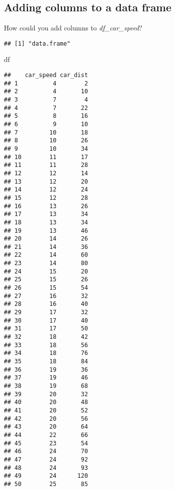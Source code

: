 \documentclass[
]{article}
\newenvironment{Shaded}{\begin{snugshade}}{\end{snugshade}}
\newcommand{\CommentTok}[1]{\textcolor[rgb]{0.56,0.35,0.01}{\textit{#1}}}
\newcommand{\KeywordTok}[1]{\textcolor[rgb]{0.13,0.29,0.53}{\textbf{#1}}}
\newcommand{\NormalTok}[1]{#1}
\newcommand{\OperatorTok}[1]{\textcolor[rgb]{0.81,0.36,0.00}{\textbf{#1}}}
\newcommand{\StringTok}[1]{\textcolor[rgb]{0.31,0.60,0.02}{#1}}
\begin{document}
\hypertarget{adding-columns-to-a-data-frame}{%
\subsection{Adding columns to a data
frame}\label{adding-columns-to-a-data-frame}}

How could you add columns to \emph{df\_car\_speed}?

\begin{Shaded}
\end{Shaded}

\begin{verbatim}
## [1] "data.frame"
\end{verbatim}

\begin{Shaded}
\begin{Highlighting}[]
\NormalTok{df}
\end{Highlighting}
\end{Shaded}

\begin{verbatim}
##    car_speed car_dist
## 1          4        2
## 2          4       10
## 3          7        4
## 4          7       22
## 5          8       16
## 6          9       10
## 7         10       18
## 8         10       26
## 9         10       34
## 10        11       17
## 11        11       28
## 12        12       14
## 13        12       20
## 14        12       24
## 15        12       28
## 16        13       26
## 17        13       34
## 18        13       34
## 19        13       46
## 20        14       26
## 21        14       36
## 22        14       60
## 23        14       80
## 24        15       20
## 25        15       26
## 26        15       54
## 27        16       32
## 28        16       40
## 29        17       32
## 30        17       40
## 31        17       50
## 32        18       42
## 33        18       56
## 34        18       76
## 35        18       84
## 36        19       36
## 37        19       46
## 38        19       68
## 39        20       32
## 40        20       48
## 41        20       52
## 42        20       56
## 43        20       64
## 44        22       66
## 45        23       54
## 46        24       70
## 47        24       92
## 48        24       93
## 49        24      120
## 50        25       85
\end{verbatim}
\end{document}
